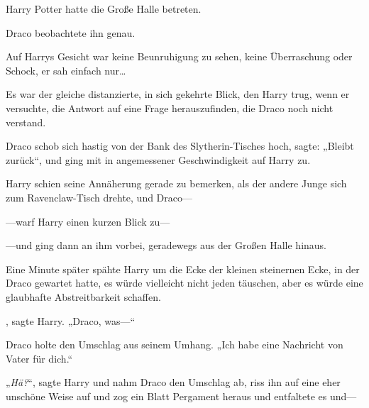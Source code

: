Harry Potter hatte die Große Halle betreten.

Draco beobachtete ihn genau.

Auf Harrys Gesicht war keine Beunruhigung zu sehen, keine Überraschung oder Schock, er sah einfach nur…

Es war der gleiche distanzierte, in sich gekehrte Blick, den Harry trug, wenn er versuchte, die Antwort auf eine Frage herauszufinden, die Draco noch nicht verstand.

Draco schob sich hastig von der Bank des Slytherin-Tisches hoch, sagte: „Bleibt zurück“, und ging mit in angemessener Geschwindigkeit auf Harry zu.

Harry schien seine Annäherung gerade zu bemerken, als der andere Junge sich zum Ravenclaw-Tisch drehte, und Draco—

—warf Harry einen kurzen Blick zu—

—und ging dann an ihm vorbei, geradewegs aus der Großen Halle hinaus.

Eine Minute später spähte Harry um die Ecke der kleinen steinernen Ecke, in der Draco gewartet hatte, es würde vielleicht nicht jeden täuschen, aber es würde eine glaubhafte Abstreitbarkeit schaffen.

, sagte Harry. „Draco, was—“

Draco holte den Umschlag aus seinem Umhang. „Ich habe eine Nachricht von Vater für dich.“

„\emph{Hä?}“, sagte Harry und nahm Draco den Umschlag ab, riss ihn auf eine eher unschöne Weise auf und zog ein Blatt Pergament heraus und entfaltete es und—

